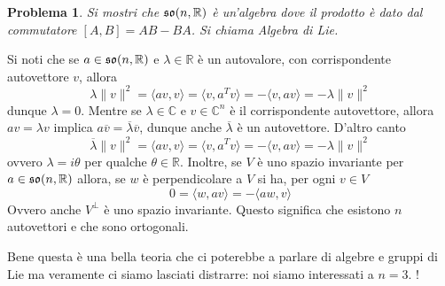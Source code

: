 \documentclass{amsart}
\numberwithin{equation}{section}
\newtheorem{pro}{Problema}
\newcommand\bC{{\mathbb C}}
\newcommand\bR{{\mathbb R}}
\newcommand{\lie}{\frak s\frak o}
\begin{document}
\begin{pro}
Si mostri che $\lie(n,\bR)$ \`e un'algebra dove il prodotto \`e dato dal commutatore $[A,B]=AB-BA$. Si chiama Algebra di Lie.
\end{pro}
Si noti che se $a\in \lie(n,\bR)$ e $\lambda\in\bR$ \`e un autovalore, con corrispondente autovettore $v$, allora
\[
\lambda\|v\|^2=\langle av, v\rangle=\langle v,a^T v\rangle=-\langle v,a v\rangle=-\lambda\|v\|^2
\]
dunque $\lambda=0$. Mentre se $\lambda\in \bC$ e $v\in\bC^n$ \`e il corrispondente autovettore, allora $av=\lambda v$ implica $a\overline v=\overline \lambda \overline v$, dunque anche $\overline \lambda$ \`e un autovettore. D'altro canto
\[
\overline\lambda\|v\|^2=\langle av, v\rangle=\langle v,a^T v\rangle=-\langle v,a v\rangle=-\lambda\|v\|^2
\]
ovvero $\lambda=i \theta$ per qualche $ \theta\in\bR$. Inoltre, se $V$ \`e uno spazio invariante per $a\in \lie(n,\bR)$ allora, se $w$ \`e perpendicolare a $V$ si ha, per ogni $v\in V$
\[
0=\langle w,a v\rangle=-\langle a w, v\rangle
\]
Ovvero anche $V^\perp$ \`e uno spazio invariante. Questo significa che esistono $n$ autovettori e che sono ortogonali.

Bene questa \`e una bella teoria che ci poterebbe a parlare di algebre e gruppi di Lie ma veramente ci siamo lasciati distrarre: noi siamo interessati a $n=3$. !
\end{document}
